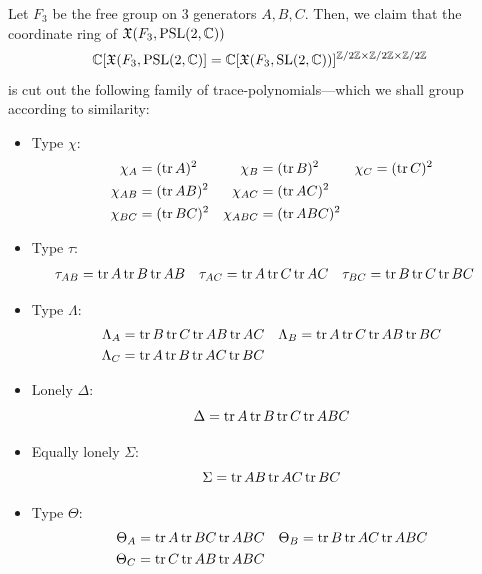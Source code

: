 \documentclass[11pt]{article}
\begin{document}
Let $F_3$ be the free group on $3$ generators $A,B,C$. Then, we claim that
the coordinate ring of $\frakX(F_3,\PSL(2,\bbC))$
\[
  \bbC[\frakX(F_3,\PSL(2,\bbC)]=\bbC[\frakX(F_3,\SL(2,\bbC))]^{\bbZ/2\bbZ\times\bbZ/2\bbZ\times\bbZ/2\bbZ}
\]
is cut out the following family of trace-polynomials---which we shall group
according to similarity:
\begin{itemize}
\item Type $\chi$:
  \begin{align*}
    \chi_A&=(\tr A)^2&\chi_B&=(\tr B)^2&\chi_C&=(\tr C)^2\\
    \chi_{AB}&=(\tr AB)^2&\chi_{AC}&=(\tr AC)^2 \\
    \chi_{BC}&=(\tr BC)^2&\chi_{ABC}&=(\tr ABC)^2
  \end{align*}
\item Type $\tau$:
  \begin{align*}
    \tau_{AB}&=\tr A\tr B\tr AB &\tau_{AC}&=\tr A\tr C\tr AC &\tau_{BC}&=\tr B\tr C\tr BC
  \end{align*}
\item Type $\Lambda$:
  \begin{align*}
    \Lambda_A&=\tr B\tr C\tr AB\tr AC
    &\Lambda_B&=\tr A\tr C\tr AB\tr BC\\
    \Lambda_C&=\tr A\tr B\tr AC\tr BC
  \end{align*}
\item Lonely $\Delta$:
  \[
    \Delta= \tr A\tr B\tr C\tr ABC
  \]
\item Equally lonely $\Sigma$:
  \[
    \Sigma= \tr AB\tr AC\tr BC
  \]
\item Type $\Theta$:
  \begin{align*}
    \Theta_A&=\tr A\tr BC\tr ABC&\Theta_B&=\tr B\tr AC\tr ABC \\
    \Theta_C&=\tr C\tr AB\tr ABC
  \end{align*}
\end{itemize}
\end{document}
